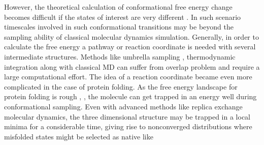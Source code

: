 \documentclass[12pt]{article}
\begin{document}
However, the theoretical calculation of conformational free energy change becomes difficult if the
states of interest are very different \cite{Meirovitch2007}. In such scenario timescales involved in
such conformational transitions may
be beyond the sampling ability of classical molecular dynamics simulation.  Generally, in order to
calculate the free energy a pathway or reaction coordinate is needed with several intermediate structures.
Methods like umbrella sampling \cite{Torrie1977}, thermodynamic integration \cite{Tironi1994} along with classical MD can suffer from
overlap problem and require a large computational effort. The idea of a reaction coordinate became
even more
complicated in the case of protein folding.  As the free energy landscape for protein folding 
is rough \cite{Dill1997}, \cite{Dill2008}, the molecule 
can get trapped in an energy well during conformational sampling. Even with 
advanced methods like replica exchange molecular dynamics, the three dimensional structure may be
trapped in a local minima for a considerable time, giving rise to nonconverged distributions where
misfolded states might be selected as native like
\end{document}
